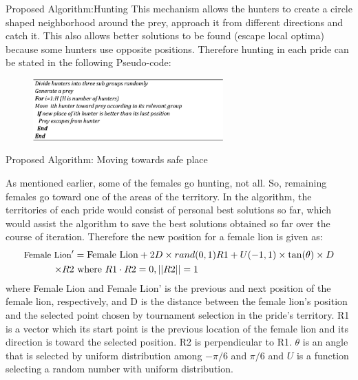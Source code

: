 \documentclass{beamer}
\begin{document}
\begin{frame}{Proposed Algorithm:Hunting}
This mechanism allows the hunters to create a circle shaped neighborhood around the prey, approach it from different directions and catch it. This also allows better solutions to be found (escape local optima) because some hunters use opposite positions.
Therefore hunting in each pride can be stated in the following Pseudo-code:
\begin{figure}[h]
\begin{center}
\includegraphics[width=0.65\textwidth]{img/pa/hunting_pseudo}
\end{center}
\end{figure}
\end{frame}

\begin{frame}{Proposed Algorithm: Moving towards safe place}

As mentioned earlier, some of the females go hunting, not all. So, remaining females go toward one of the areas of the territory. In the algorithm, the territories of each pride would consist of personal best solutions so far, which would assist the algorithm to save the best solutions obtained so far over the course of iteration.
Therefore the new position for a female lion is given as:
\begin{align*}
\small
\text{Female Lion}' &= \text{Female Lion} + 2D \times rand(0,1){R1} + U(-1,1) \times \tan(\theta) \times D \\ 
\times {R2} &\text{  where } R1 \cdot R2 = 0, ||R2|| = 1
\normalsize
\end{align*}
where Female Lion and Female Lion' is the previous and next position of the female lion, respectively, and D is the distance between the female lion's position and the selected point chosen by tournament selection in the pride's territory.
{R1} is a vector which its start point is the previous location of the female lion and its direction is toward the selected position. {R2} is perpendicular to {R1}. $\theta$ is an angle that is selected by uniform distribution among $-\pi/6$ and $\pi/6$ and $U$ is a function selecting a random number with uniform distribution.
\end{frame}
\end{document}
